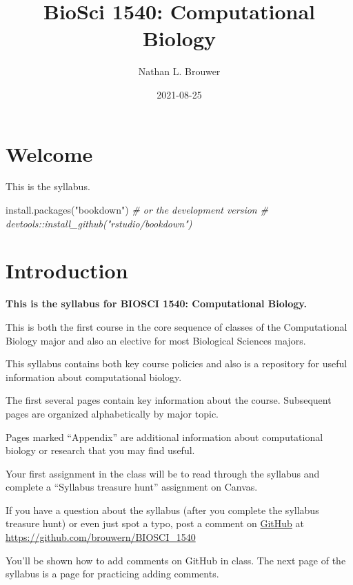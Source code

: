 \documentclass[
]{book}
\title{BioSci 1540: Computational Biology}
\author{Nathan L. Brouwer}
\date{2021-08-25}
\newenvironment{Shaded}{\begin{snugshade}}{\end{snugshade}}
\newcommand{\CommentTok}[1]{\textcolor[rgb]{0.56,0.35,0.01}{\textit{#1}}}
\newcommand{\FunctionTok}[1]{\textcolor[rgb]{0.00,0.00,0.00}{#1}}
\newcommand{\NormalTok}[1]{#1}
\newcommand{\StringTok}[1]{\textcolor[rgb]{0.31,0.60,0.02}{#1}}
\begin{document}
\maketitle

{
\setcounter{tocdepth}{1}
\tableofcontents
}
\hypertarget{welcome}{%
\chapter{Welcome}\label{welcome}}

This is the syllabus.

\begin{Shaded}
\begin{Highlighting}[]
\FunctionTok{install.packages}\NormalTok{(}\StringTok{"bookdown"}\NormalTok{)}
\CommentTok{\# or the development version}
\CommentTok{\# devtools::install\_github("rstudio/bookdown")}
\end{Highlighting}
\end{Shaded}

\hypertarget{intro}{%
\chapter{Introduction}\label{intro}}

\textbf{This is the syllabus for BIOSCI 1540: Computational Biology.}

This is both the first course in the core sequence of classes of the Computational Biology major and also an elective for most Biological Sciences majors.

This syllabus contains both key course policies and also is a repository for useful information about computational biology.

The first several pages contain key information about the course. Subsequent pages are organized alphabetically by major topic.

Pages marked ``Appendix'' are additional information about computational biology or research that you may find useful.

Your first assignment in the class will be to read through the syllabus and complete a ``Syllabus treasure hunt'' assignment on Canvas.

If you have a question about the syllabus (after you complete the syllabus treasure hunt) or even just spot a typo, post a comment on \href{https://github.com/brouwern/BIOSCI_1540}{GitHub} at \url{https://github.com/brouwern/BIOSCI_1540}

You'll be shown how to add comments on GitHub in class. The next page of the syllabus is a page for practicing adding comments.
\end{document}
